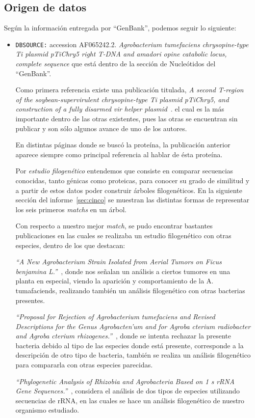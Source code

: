 \subsection{Origen de datos}
Según la información entregada por ``GenBank'', podemos seguir lo siguiente:
\begin{itemize}
	\item \texttt{DBSOURCE:} accession AF065242.2.
		\emph{Agrobacterium tumefaciens chrysopine-type Ti plasmid pTiChry5 right T-DNA and amadori opine catabolic locus, complete sequence}
		que está dentro de la sección de Nucleótidos del ``GenBank''.

		Como primera referencia existe una publicación titulada,
		\emph{A second T-region of the soybean-supervirulent chrysopine-type Ti plasmid pTiChry5, and construction of a fully disarmed vir helper plasmid}~\cite{1}.
		el cual es la más importante dentro de las otras existentes, pues las otras se encuentran sin publicar y son sólo algunos avance de uno de los autores.

		En distintas páginas donde se buscó la proteína, la publicación anterior aparece siempre como principal referencia al hablar de ésta proteína.

		Por \emph{estudio filogenético} entendemos que consiste en comparar secuencias conocidas,
		tanto génicas como proteicas, para conocer su grado de similitud y a partir de estos datos
		poder construir árboles filogenéticos.
		En la siguiente sección del informe~\ref{sec:cinco} se muestran las distintas formas de representar los
		seis primeros \emph{matchs} en un árbol.

		Con respecto a nuestro mejor \emph{match}, se pudo encontrar bastantes publicaciones en las cuales
		se realizaba un estudio filogenético con otras especies, dentro de los que destacan:

		\emph{``A New Agrobacterium Strain Isolated from Aerial Tumors on Ficus benjamina L.''}~\cite{2},
		donde nos señalan un análisis a ciertos tumores en una planta en especial, viendo la aparición y comportamiento
		de la A. tumafaciends, realizando también un análisis filogenético con otras bacterias presentes.

		\emph{``Proposal for Rejection of Agrobacterium tumefaciens and Revised Descriptions for the Genus Agrobacten'um and for Agroba cterium radiobacter and Agroba cterium rhizogenes.''}~\cite{3},
		donde se intenta rechazar la presente bacteria debido al tipo de las especies donde está presente, corresponde a la descripción de otro tipo de bacteria,
		también se realiza un análisis filogenético para compararla con otras especies parecidas.

		\emph{``Phylogenetic Analysis of Rhizobia and Agrobacteria Based on 1 s rRNA Gene Sequences.''}~\cite{4},
		considera el análisis de dos tipos de especies utilizando secuencias de rRNA, en las cuales
		se hace un análisis filogenético de nuestro organismo estudiado.
\end{itemize}
